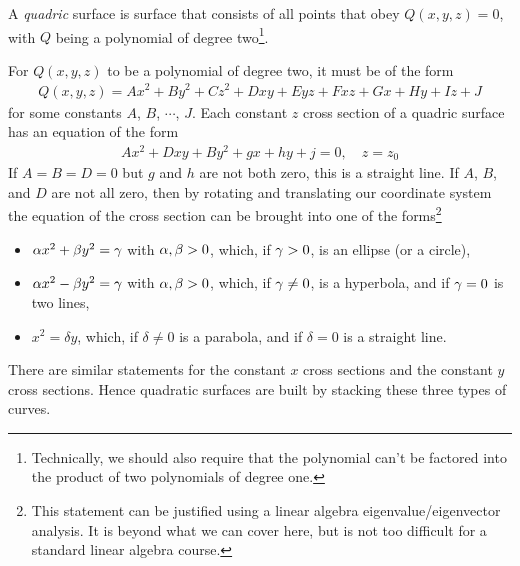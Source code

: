 \begin{defn}[Quadrics]\label{def quadric}
A \emph{quadric} surface is surface that consists of all points that
obey $Q(x,y,z)=0$, with $Q$ being a polynomial of degree two\footnote{Technically, we should also require that the polynomial
can't be factored into the product of two polynomials of degree one.}. 
\end{defn}
For $Q(x,y,z)$ to be a polynomial of degree two, it must be of the form
\begin{align*}
Q(x,y,z) = Ax^2 +By^2 +Cz^2 +Dxy +Eyz +Fxz +Gx +Hy +Iz +J
\end{align*}
for some constants $A$, $B$, $\cdots$, $J$. Each constant $z$ cross section
of a quadric surface has an equation of the form
\begin{align*}
Ax^2 + Dxy +By^2 +gx +hy +j =0,\quad z=z_0
\end{align*}
If $A=B=D=0$ but $g$ and $h$ are not both zero, this is a straight line.
If $A$, $B$, and $D$ are not all zero, then by rotating and translating 
our coordinate system the equation of the cross section can be brought
into one of the forms\footnote{This statement can be justified using a 
linear algebra eigenvalue/eigenvector analysis. It is 
beyond what we can cover here, but is not too difficult for a standard 
linear algebra course.}
\begin{itemize}
\item
$\alpha x^2 + \beta y^2 =\gamma$ with $\alpha,\beta>0$, which, if $\gamma>0$, is an ellipse
(or a circle),
\item
$\alpha x^2 - \beta y^2 =\gamma$ with $\alpha,\beta>0$, which, if $\gamma\ne0$, is a hyperbola,
and if $\gamma=0$ is two lines,
\item 
$x^2 = \delta y$, which, if $\delta\ne 0$ is a parabola, and if $\delta=0$ is a straight line.
\end{itemize}
There are similar statements for the constant $x$ cross sections and the
constant $y$ cross sections. Hence quadratic surfaces are built by stacking
these three types of curves.

